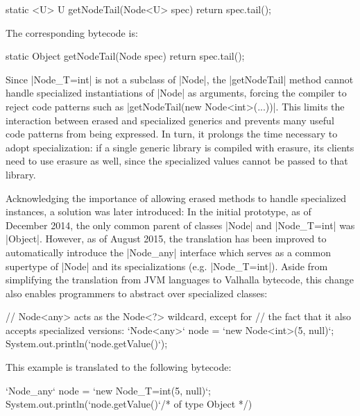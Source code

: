 \begin{lstlisting-nobreak}
static <U> U getNodeTail(Node<U> spec) {
  return spec.tail();
}
\end{lstlisting-nobreak}

The corresponding bytecode is:

\begin{lstlisting-nobreak}
static Object getNodeTail(Node spec) {
  return spec.tail();
}
\end{lstlisting-nobreak}

Since |Node_{T=int}| is not a subclass of |Node|, the |getNodeTail| method cannot handle specialized instantiations of |Node| as arguments, forcing the compiler to reject code patterns such as |getNodeTail(new Node<int>(...))|.
This limits the interaction between erased and specialized generics and prevents many useful code patterns from being expressed. In turn, it prolongs the time necessary to adopt specialization: if a single generic library is compiled with erasure, its clients need to use erasure as well, since the specialized values cannot be passed to that library.

Acknowledging the importance of allowing erased methods to handle specialized instances, a solution was later introduced: In the initial prototype, as of December 2014, the only common parent of classes |Node| and |Node_{T=int}| was |Object|. However, as of August 2015, the translation has been improved to automatically introduce the |Node_any| interface which serves as a common supertype of |Node| and its specializations (e.g. |Node_{T=int}|). Aside from simplifying the translation from JVM languages to Valhalla bytecode, this change also enables programmers to abstract over specialized classes:

\begin{lstlisting-nobreak}
// Node<any> acts as the Node<?> wildcard, except for
// the fact that it also accepts specialized versions:
`Node<any>` node = `new Node<int>(5, null)`;
System.out.println(`node.getValue()`);
\end{lstlisting-nobreak}

This example is translated to the following bytecode:

\begin{lstlisting-nobreak}
`Node_any` node = `new Node_{T=int}(5, null)`;
System.out.println(`node.getValue()`/* of type Object */)
\end{lstlisting-nobreak}


